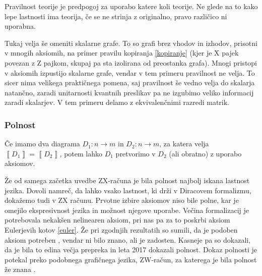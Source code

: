 \documentclass[mat1]{fmfdelo}
\newcommand{\interpret}[1]{\left\llbracket #1 \right\rrbracket}
\begin{document}
Pravilnost teorije je predpogoj za uporabo katere koli teorije. Ne glede na to kako lepe lastnosti ima teorija, če se ne strinja z originalno, pravo različico ni uporabna.

Tukaj velja še omeniti skalarne grafe. To so grafi brez vhodov in izhodov, prisotni v mnogih aksiomih, na primer pravilu kopiranja \ref{kopiranje} (kjer je X pajek povezan z Z pajkom, skupaj pa sta izolirana od preostanka grafa). Mnogi pristopi v aksiomih izpustijo skalarne grafe, vendar v tem primeru pravilnost ne velja. To sicer nima velikega praktičnega pomena, saj pravilnost še vedno velja do skalarja natančno, zaradi unitarnosti kvantnih preslikav pa ne izgubimo veliko informacij zaradi skalarjev. V tem primeru delamo z ekvivalenčnimi razredi matrik.
\subsubsection{Polnost}
\begin{izrek}[Polnost]
    Če imamo dva diagrama \(D_1:n\to m\) in \(D_2:n\to m\), za katera velja \(\interpret{D_1} = \interpret{D_2}\), potem lahko \(D_1\) pretvorimo v \(D_2\) (ali obratno) z uporabo aksiomov.
\end{izrek}
Že od samega začetka uvedbe ZX-računa je bila polnost najbolj iskana lastnost jezika. Dovoli namreč, da lahko vsako lastnost, ki drži v Diracovem formalizmu, dokažemo tudi v ZX računu. Prvotne izbire aksiomov niso bile polne, kar je omejilo ekspresivnost jezika in možnost njegove uporabe. Večina formalizacij je potrebovala nekakšen nelinearen aksiom, pri nas pa za to poskrbi aksiom Eulerjevih kotov \ref{euler}. Že pri zgodnjih rezultatih so sumili, da je podoben aksiom potreben \cite{Schr_der_de_Witt_2014}, vendar ni bilo znano, ali je zadosten. Kasneje pa so dokazali, da je bila to edina večja prepreka in leta 2017 dokazali polnost. Dokaz polnosti je potekal preko podobnega grafičnega jezika, ZW-račun, za katerega je bila polnost že znana \cite{kangfengng}.
\end{document}

